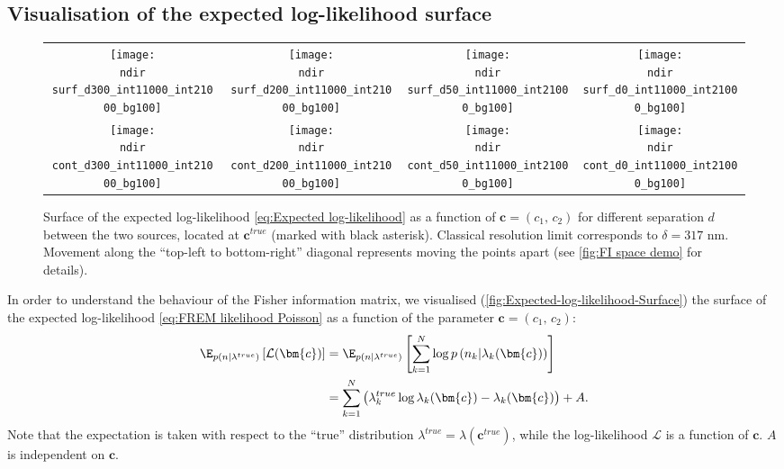 \subsection{Visualisation of the expected log-likelihood surface\label{sub:LL surface}}
\begin{figure}[thb]
	\centering
	\newcommand{\sizeff}{.18}
	\newcommand{\sizegg}{.16}
	\newcommand{\ndir}{\qd gFREM/images/LLsurface/}
	\begin{tabular}{cccc}
		\subfloat[$d=300$ nm]{\texttt{[image: \\ndir surf\_d300\_int11000\_int21000\_bg100]}} 		
		& \subfloat[$d=200$ nm]{\texttt{[image: \\ndir surf\_d200\_int11000\_int21000\_bg100]}} 		
		& \subfloat[$d=50$ nm]{\texttt{[image: \\ndir surf\_d50\_int11000\_int21000\_bg100]}} 		
		& \subfloat[$d=0$ nm]{\texttt{[image: \\ndir surf\_d0\_int11000\_int21000\_bg100]}} 		
		\tabularnewline
		\subfloat[$d=300$ nm]{\texttt{[image: \\ndir cont\_d300\_int11000\_int21000\_bg100]}} 
		& \subfloat[$d=200$ nm]{\texttt{[image: \\ndir cont\_d200\_int11000\_int21000\_bg100]}} 		
		& \subfloat[$d=50$ nm]{\texttt{[image: \\ndir cont\_d50\_int11000\_int21000\_bg100]}} 		
		& \subfloat[$d=0$ nm]{\texttt{[image: \\ndir cont\_d0\_int11000\_int21000\_bg100]}} 		
		\tabularnewline
	\end{tabular}
	\caption{Surface of the expected log-likelihood \autoref{eq:Expected log-likelihood} as a function of $\bm{c}=(c_1,\, c_2)$ for different separation $d$ between the two sources, located at $\bm{c}^{true}$ (marked with black asterisk). Classical resolution limit corresponds to $\delta=317$ nm. Movement along the ``top-left to bottom-right'' diagonal represents moving the points apart (see \autoref{fig:FI space demo} for details).}	
	\label{fig:Expected-log-likelihood-Surface}
\end{figure}

In order to understand the behaviour of the Fisher information matrix, we visualised (\autoref{fig:Expected-log-likelihood-Surface}) the surface of the expected log-likelihood \autoref{eq:FREM likelihood Poisson} as a function of the parameter $\bm{c}=(c_1,\, c_2)$: 
%
\begin{alignat}{2}
	\E_{p(n|\lambda^{true})}\left[\mathcal{L}(\bm{c})\right]
	&=\E_{p(n|\lambda^{true})}\left[\sum_{k=1}^N\log p\left(n_k|\lambda_k(\bm{c})\right)\right]\nonumber\\
	&=\sum_{k=1}^N\left(\lambda_k^{true}\log\lambda_k(\bm{c})-\lambda_k(\bm{c})\right)+A.
	\label{eq:Expected log-likelihood}
\end{alignat}
%
Note that the expectation is taken with respect to the ``true'' distribution $\lambda^{true}=\lambda(\bm{c}^{true})$, while the log-likelihood $\mathcal{L}$ is a function of $\bm{c}$. $A$ is independent on $\bm{c}$. 

